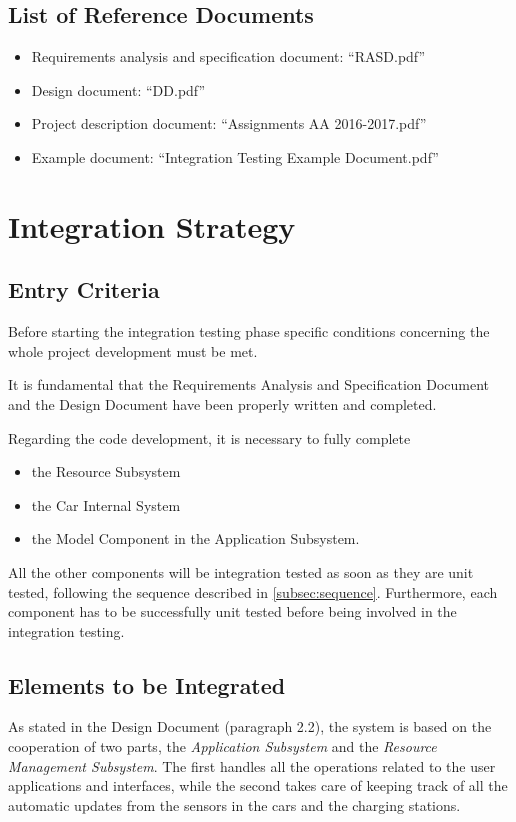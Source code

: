 \documentclass[english]{article}
\begin{document}
\subsection{List of Reference Documents}

\begin{itemize}
	\item{Requirements analysis and specification document: “RASD.pdf”}
	\item{Design document: “DD.pdf”}
	\item{Project description document: “Assignments AA 2016-2017.pdf”}
	\item{Example document: “Integration Testing Example Document.pdf”}
\end{itemize}

\newpage
\section{Integration Strategy}

\subsection{Entry Criteria}

Before starting the integration testing phase specific conditions concerning the whole project development must be met.

It is fundamental that the Requirements Analysis and Specification Document and the Design Document have been properly written and completed.

Regarding the code development, it is necessary to fully complete 
\begin{itemize}
\item the Resource Subsystem
\item the Car Internal System
\item the Model Component in the Application Subsystem.
\end{itemize}
All the other components will be integration tested as soon as they are unit tested, following the sequence described in \autoref{subsec:sequence}.
Furthermore, each component has to be successfully unit tested before being involved in the integration testing.


\subsection{Elements to be Integrated}

As stated in the Design Document (paragraph 2.2), the system is based on the cooperation of two parts, the \emph{Application Subsystem}  and the \emph{Resource Management Subsystem}. The first handles all the operations related to the user applications and interfaces, while the second takes care of keeping track of all the automatic updates from the sensors in the cars and the charging stations.
\end{document}
